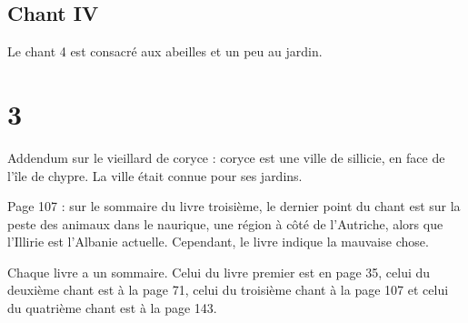 \documentclass[a4paper,12pt]{book}
\begin{document}
\subsection{Chant IV}
Le chant 4 est consacré aux abeilles et un peu au jardin.


\section{3}
\par Addendum sur le vieillard de coryce : coryce est une ville de sillicie, en face de l'île de chypre. La ville était connue pour ses jardins.
\par Page 107 : sur le sommaire du livre troisième, le dernier point du chant est sur la peste des animaux dans le naurique, une région à côté de l'Autriche, alors que l'Illirie est l'Albanie actuelle. Cependant, le livre indique la mauvaise chose.
\par Chaque livre a un sommaire. Celui du livre premier est en page 35, celui du deuxième chant est à la page 71, celui du troisième chant à la page 107 et celui du quatrième chant est à la page 143.
\end{document}
